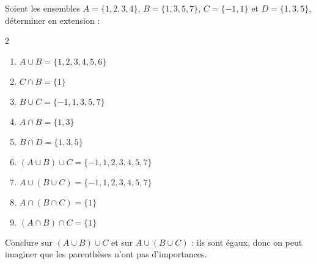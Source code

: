 \begin{solution}
Soient les ensembles $A=\{1,2,3,4\}$, $B=\{1,3,5,7\}$, $C= \{-1,1\}$ et $D = \{1,3,5\}$, déterminer en extension :
\begin{multicols}2
	\begin{enumerate}
	\item $ A\cup B = \{1,2,3,4,5,6\}$
	\item $ C \cap B = \{1\} $
	\item $ B \cup C  = \{-1,1,3,5,7\}$
	\item $ A \cap B = \{1,3\}$
	\item $ B \cap D = \{1,3,5\}$
	\item $ (A\cup B)\cup C = \{-1,1,2,3,4,5,7\}$
	\item $ A \cup (B\cup C) = \{-1,1,2,3,4,5,7\}$
	\item $ A \cap (B\cap C) = \{1\}$
	\item $ (A \cap B) \cap C = \{1\}$
	\end{enumerate}
\end{multicols}
Conclure sur $ (A\cup B)\cup C $ et sur $ A \cup (B \cup C) $ : ils sont égaux, donc on peut imaginer que les parenthèses n'ont pas d'importances.
\end{solution}
